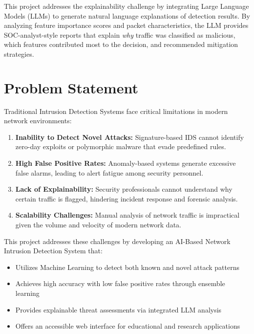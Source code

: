 \documentclass[12pt,a4paper]{article}
\begin{document}
This project addresses the explainability challenge by integrating Large Language Models (LLMs) to generate natural language explanations of detection results. By analyzing feature importance scores and packet characteristics, the LLM provides SOC-analyst-style reports that explain \textit{why} traffic was classified as malicious, which features contributed most to the decision, and recommended mitigation strategies.

\section{Problem Statement}

Traditional Intrusion Detection Systems face critical limitations in modern network environments:

\begin{enumerate}
    \item \textbf{Inability to Detect Novel Attacks:} Signature-based IDS cannot identify zero-day exploits or polymorphic malware that evade predefined rules.
    
    \item \textbf{High False Positive Rates:} Anomaly-based systems generate excessive false alarms, leading to alert fatigue among security personnel.
    
    \item \textbf{Lack of Explainability:} Security professionals cannot understand why certain traffic is flagged, hindering incident response and forensic analysis.
    
    \item \textbf{Scalability Challenges:} Manual analysis of network traffic is impractical given the volume and velocity of modern network data.
\end{enumerate}

This project addresses these challenges by developing an AI-Based Network Intrusion Detection System that:

\begin{itemize}
    \item Utilizes Machine Learning to detect both known and novel attack patterns
    \item Achieves high accuracy with low false positive rates through ensemble learning
    \item Provides explainable threat assessments via integrated LLM analysis
    \item Offers an accessible web interface for educational and research applications
\end{itemize}
\end{document}
